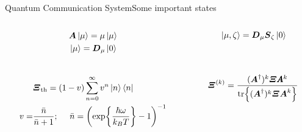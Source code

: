 \begin{frame}{Quantum Communication System}{Some important states}
    \begin{columns}

        \begin{column}{0.5\textwidth}
            \begin{equation*}\begin{split}
                &\Operator{A}\ket{\mu}=\mu\ket{\mu}\\
                &\ket{\mu}=\Operator{D}_\mu\ket{0}
            \end{split}\end{equation*}
            \\ \mbox{}
            \begin{equation*}\begin{split}
                &\Operator{\varXi}_{\mathrm{th}}=(1-v)\sum_{n=0}^{\infty}v^n\ket{n}\bra{n}\\
                v=&\frac{\bar{n}}{\bar{n}+1};\ \ \ \ 
                \bar{n}=\left(\exp{\frac{\hbar\omega}{k_B T}}-1\right)^{-1}
            \end{split}\end{equation*}
        \end{column}
        \begin{column}{0.5\textwidth}
            \begin{equation*}
                \ket*{\mu,\zeta}=\Operator{D}_\mu\Operator{S}_\zeta\ket{0}
            \end{equation*}
            \\ \mbox{}
            \\
            \begin{equation*}
                \Operator{\varXi}^{(k)}=\frac{(\Operator{A}^\dagger)^k\Operator{\varXi}\pmb{A}^k}
                {\tr{(\Operator{A}^\dagger)^k\Operator{\varXi}\Operator{A}^k}}
            \end{equation*}
            \mbox{}
            \mbox{}
        \end{column}
    \end{columns}

    \ \\ \mbox{} \\ \ \mbox{}
\end{frame}
